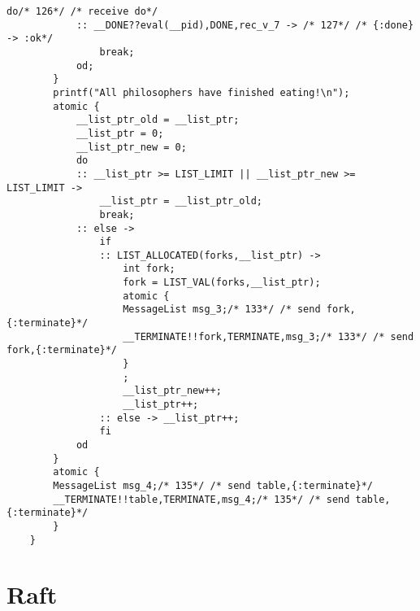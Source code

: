\begin{lstlisting}[xleftmargin=.001\linewidth, xrightmargin=0.001\linewidth, caption={Dining Philosophers Promela translation.}, label={lst:promela_dp}]
            do/* 126*/ /* receive do*/ 
            :: __DONE??eval(__pid),DONE,rec_v_7 -> /* 127*/ /* {:done} -> :ok*/ 
                break;
            od;
        }
        printf("All philosophers have finished eating!\n");
        atomic {
            __list_ptr_old = __list_ptr;
            __list_ptr = 0;
            __list_ptr_new = 0;
            do
            :: __list_ptr >= LIST_LIMIT || __list_ptr_new >= LIST_LIMIT -> 
                __list_ptr = __list_ptr_old;
                break;
            :: else -> 
                if
                :: LIST_ALLOCATED(forks,__list_ptr) -> 
                    int fork;
                    fork = LIST_VAL(forks,__list_ptr);
                    atomic {
                    MessageList msg_3;/* 133*/ /* send fork,{:terminate}*/ 
                    __TERMINATE!!fork,TERMINATE,msg_3;/* 133*/ /* send fork,{:terminate}*/ 
                    }
                    ;
                    __list_ptr_new++;
                    __list_ptr++;
                :: else -> __list_ptr++;
                fi
            od
        }
        atomic {
        MessageList msg_4;/* 135*/ /* send table,{:terminate}*/ 
        __TERMINATE!!table,TERMINATE,msg_4;/* 135*/ /* send table,{:terminate}*/ 
        }
    }    
\end{lstlisting}

\section{Raft}

